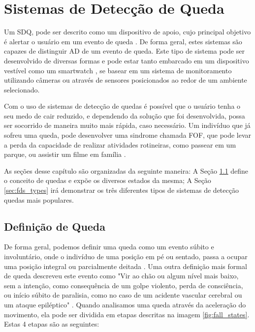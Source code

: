 \chapter{Sistemas de Detecção de Queda}
\label{cap:sistemasRecomendacao}

Um \ac{SDQ}, pode ser descrito como um dispositivo de apoio, cujo principal objetivo é alertar o usuário em um evento de queda \citep{igual2013challenges}. De forma geral, estes sistemas são capazes de distinguir \ac{AD}  de um evento de queda. Este tipo de sistema pode ser desenvolvido de diversas formas e pode estar tanto embarcado em um dispositivo vestível como um smartwatch , se basear em um sistema de monitoramento utilizando câmeras ou através de sensores posicionados ao redor de um ambiente selecionado. 

Com o uso de sistemas de detecção de quedas é possível que o usuário tenha o seu medo de cair reduzido, e dependendo da solução que foi desenvolvida, possa ser socorrido de maneira muito mais rápida, caso necessário. Um indivíduo que já sofreu uma queda, pode desenvolver uma sindrome chamada \ac{FOF}, que pode levar a perda da capacidade de realizar atividades rotineiras, como passear em um parque, ou assistir um filme em família \citep{legters2002fear}.

As seções desse capítulo são organizadas da seguinte maneira: A Seção \ref{sec:fall_definition} define o conceito de quedas e expõe os diversos estados da mesma; A Seção \ref{sec:fds_types} irá demonstrar os três diferentes tipos de sistemas de detecção quedas mais populares.



\section{Definição de Queda}
\label{sec:fall_definition}
De forma geral, podemos definir uma queda como um evento súbito e involuntário, onde o indivíduo de uma posição em pé ou sentado, passa a ocupar uma posição integral ou parcialmente deitada  \citep{igual2013challenges}. Uma outra definição mais formal de queda descreveu este evento como "Vir ao chão ou algum nível mais baixo, sem a intenção, como consequência de um golpe violento, perda de consciência, ou início súbito de paralisia, como no caso de um acidente vascular cerebral ou um ataque epiléptico" \citep{gibson1987prevention}. Quando analisamos uma queda através da aceleração do movimento, ela pode ser dividida em etapas descritas na imagem \ref{fig:fall_states}. Estas 4 etapas são as seguintes:


